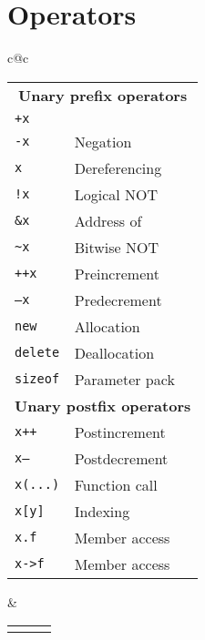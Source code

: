 \chapter{Operators}

\begingroup
\newcommand{\overloadable}[2]{{\tt #1} & #2 & \Checkmark}
\newcommand{\notoverloadable}[2]{{\tt #1} & #2 & \XSolidBrush}

\begin{center}
  \begin{tabular}{c@{\hspace{1cm}}c}
    \begin{tabular}{llc}
      \rotatebox{45}{\textbf{Operator}} & \rotatebox{45}{\textbf{Description}} & \rotatebox{90}{\textbf{Overloadable}} \\
      \toprule
      \multicolumn{3}{c}{\bf\sc Unary prefix operators} \\
      \midrule
      \overloadable{+x}{} \\
      \overloadable{-x}{Negation} \\
      \overloadable{*x}{Dereferencing} \\
      \overloadable{!x}{Logical NOT} \\
      \overloadable{\&x}{Address of} \\
      \overloadable{\~{}x}{Bitwise NOT} \\
      \overloadable{++x}{Preincrement} \\
      \overloadable{--x}{Predecrement} \\
      \overloadable{new}{Allocation} \\
      \overloadable{delete}{Deallocation} \\
      \overloadable{sizeof}{Parameter pack} \\
      \midrule
      \multicolumn{3}{c}{\bf\sc Unary postfix operators} \\
      \midrule
      \overloadable{x++}{Postincrement} \\
      \overloadable{x--}{Postdecrement} \\
      \overloadable{x(...)}{Function call} \\
      \overloadable{x[y]}{Indexing} \\
      \notoverloadable{x.f}{Member access} \\
      \overloadable{x->f}{Member access} \\
      \bottomrule
    \end{tabular}
    &
    \begin{tabular}{llc}
      \rotatebox{45}{\textbf{Operator}} & \rotatebox{45}{\textbf{Description}} & \rotatebox{90}{\textbf{Overloadable}} \\

\end{tabular}
\end{tabular}
\end{center}
